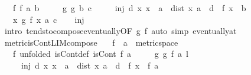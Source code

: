 \begin{isabellebody}
\ \ \ f{\isacharcolon}{\kern0pt}\ {\isachardoublequoteopen}f\ {\isasymmidarrow}a{\isasymrightarrow}\ b{\isachardoublequoteclose}\isanewline
\ \ \ \ \ g{\isacharcolon}{\kern0pt}\ {\isachardoublequoteopen}g\ {\isasymmidarrow}b{\isasymrightarrow}\ c{\isachardoublequoteclose}\isanewline
\ \ \ \ \ inj{\isacharcolon}{\kern0pt}\ {\isachardoublequoteopen}{\isasymexists}d{\isachargreater}{\kern0pt}{}{\isachardot}{\kern0pt}\ {\isasymforall}x{\isachardot}{\kern0pt}\ x\ {\isasymnoteq}\ a\ {\isasymand}\ dist\ x\ a\ {\isacharless}{\kern0pt}\ d\ {\isasymlongrightarrow}\ f\ x\ {\isasymnoteq}\ b{\isachardoublequoteclose}\isanewline
\ \ \ {\isachardoublequoteopen}{\isacharparenleft}{\kern0pt}{\isasymlambda}x{\isachardot}{\kern0pt}\ g\ {\isacharparenleft}{\kern0pt}f\ x{\isacharparenright}{\kern0pt}{\isacharparenright}{\kern0pt}\ {\isasymmidarrow}a{\isasymrightarrow}\ c{\isachardoublequoteclose}\isanewline
%
\isadelimproof
\ \ %
\endisadelimproof
%
\isatagproof
{}\isamarkupfalse%
\ inj\ \isamarkupfalse%
\ {\isacharparenleft}{\kern0pt}intro\ tendsto{\isacharunderscore}{\kern0pt}compose{\isacharunderscore}{\kern0pt}eventually{\isacharbrackleft}{\kern0pt}OF\ g\ f{\isacharbrackright}{\kern0pt}{\isacharparenright}{\kern0pt}\ {\isacharparenleft}{\kern0pt}auto\ simp{\isacharcolon}{\kern0pt}\ eventually{\isacharunderscore}{\kern0pt}at{\isacharparenright}{\kern0pt}%
\endisatagproof
{\isafoldproof}%
%
\isadelimproof
\isanewline
%
\endisadelimproof
\isanewline
{}\isamarkupfalse%
\ metric{\isacharunderscore}{\kern0pt}isCont{\isacharunderscore}{\kern0pt}LIM{\isacharunderscore}{\kern0pt}compose{}{\isacharcolon}{\kern0pt}\isanewline
\ \ \ f\ {\isacharcolon}{\kern0pt}{\isacharcolon}{\kern0pt}\ {\isachardoublequoteopen}{\isacharprime}{\kern0pt}a\ {\isacharcolon}{\kern0pt}{\isacharcolon}{\kern0pt}\ metric{\isacharunderscore}{\kern0pt}space\ {\isasymRightarrow}\ {\isacharunderscore}{\kern0pt}{\isachardoublequoteclose}\isanewline
\ \ \ f\ {\isacharbrackleft}{\kern0pt}unfolded\ isCont{\isacharunderscore}{\kern0pt}def{\isacharbrackright}{\kern0pt}{\isacharcolon}{\kern0pt}\ {\isachardoublequoteopen}isCont\ f\ a{\isachardoublequoteclose}\isanewline
\ \ \ \ \ g{\isacharcolon}{\kern0pt}\ {\isachardoublequoteopen}g\ {\isasymmidarrow}f\ a{\isasymrightarrow}\ l{\isachardoublequoteclose}\isanewline
\ \ \ \ \ inj{\isacharcolon}{\kern0pt}\ {\isachardoublequoteopen}{\isasymexists}d{\isachargreater}{\kern0pt}{}{\isachardot}{\kern0pt}\ {\isasymforall}x{\isachardot}{\kern0pt}\ x\ {\isasymnoteq}\ a\ {\isasymand}\ dist\ x\ a\ {\isacharless}{\kern0pt}\ d\ {\isasymlongrightarrow}\ f\ x\ {\isasymnoteq}\ f\ a{\isachardoublequoteclose}\isanewline

\end{isabellebody}
